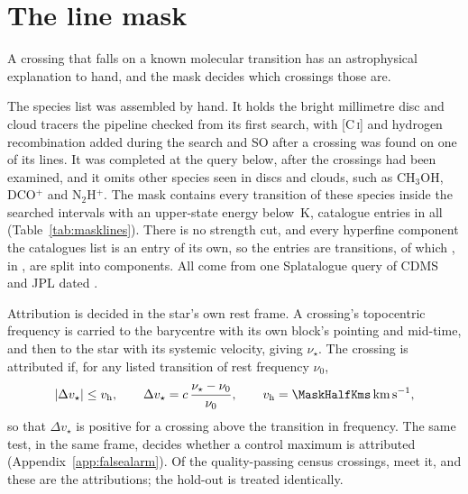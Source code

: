 \section{The line mask}
\label{app:linemask}

A crossing that falls on a known molecular transition has an astrophysical
explanation to hand, and the mask decides which crossings those are.

The species list was assembled by hand. It holds the bright
millimetre disc and cloud tracers the pipeline checked from its first search,
with [C\,\textsc{i}] and hydrogen recombination added during the search and SO
after a crossing was found on one of its lines. It was completed at the query
below, after the crossings had been examined, and it omits other species seen
in discs and clouds, such as CH$_3$OH, DCO$^{+}$ and N$_2$H$^{+}$. The mask
contains every transition of these \FrNSpec{} species inside the
\McNIsland{} searched intervals with an upper-state energy below
\McEuMax\,K, \FrNTrans{} catalogue entries in all
(Table~\ref{tab:masklines}). There is no strength cut, and every hyperfine
component the catalogues list is an entry of its own, so the \FrNTrans{}
entries are \McNRow{} transitions, of which \MkHfsNTrans, in
\MkHfsSpecList, are split into components. All come from one Splatalogue query \citep{Splatalogue2007} of CDMS and JPL
\citep{Pickett1998,CDMS2005} dated \MkListDate.

Attribution is decided in the star's own rest frame. A crossing's
topocentric frequency is carried to the barycentre with its own block's
pointing and mid-time, and then to the star with its systemic velocity,
giving $\nu_\star$. The crossing is attributed if, for any listed transition
of rest frequency $\nu_0$,
\begin{equation*}
|\Delta v_\star|\le v_{\rm h},\qquad
\Delta v_\star=c\,\frac{\nu_\star-\nu_0}{\nu_0},\qquad
v_{\rm h}=\MaskHalfKms\,{\rm km\,s^{-1}},
\end{equation*}
so that $\Delta v_\star$ is positive for a crossing above the transition in
frequency. The same test, in the same frame, decides whether a control
maximum is attributed (Appendix~\ref{app:falsealarm}). Of the
\CsNCrossQp{} quality-passing census crossings, \MkNCoinc{} meet it, and these
are the \MkAttr{} attributions; the hold-out is treated identically.

